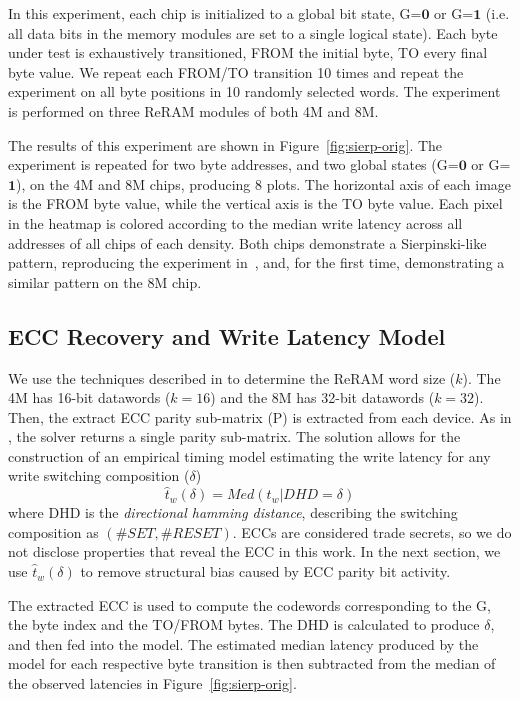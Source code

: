 In this experiment, each chip is initialized to a global bit state, G=$\mathbf{0}$ or G=$\mathbf{1}$ (i.e. all data bits in the memory modules are set to a single logical state). Each byte under test is exhaustively transitioned, FROM the initial byte, TO every final byte value. We repeat each FROM/TO transition 10 times and repeat the experiment on all byte positions in 10 randomly selected words. The experiment is performed on three ReRAM modules of both 4M and 8M.

The results of this experiment are shown in Figure~\ref{fig:sierp-orig}. The experiment is repeated for two byte addresses, and two global states (G=$\mathbf{0}$ or G=$\mathbf{1}$), on the 4M and 8M chips, producing 8 plots. The horizontal axis of each image is the FROM byte value, while the vertical axis is the TO byte value. Each pixel in the heatmap is colored according to the median write latency across all addresses of all chips of each density. Both chips demonstrate a Sierpinski-like pattern, reproducing the experiment in~\cite{tolga2024trng}, and, for the first time, demonstrating a similar pattern on the 8M chip.

\subsection{ECC Recovery and Write Latency Model}
We use the techniques described in \cite{sheaves2026brewrc} to determine the ReRAM word size ($k$). The 4M has 16-bit datawords ($k=16$) and the 8M has 32-bit datawords ($k=32$). Then, the extract ECC parity sub-matrix (P) is extracted from each device. As in \cite{sheaves2026brewrc}, the solver returns a single parity sub-matrix. The solution allows for the construction of an empirical timing model estimating the write latency for any write switching composition ($\delta$) \begin{equation}
    \hat{t}_w\left( \delta\right) = Med\left( t_w | DHD=\delta\right)
\end{equation}
where DHD is the \emph{directional hamming distance}, describing the switching composition as $(\#SET, \#RESET)$. ECCs are considered trade secrets, so we do not disclose properties that reveal the ECC in this work. In the next section, we use $\hat{t}_w\left( \delta\right)$ to remove structural bias caused by ECC parity bit activity.


The extracted ECC is used to compute the codewords corresponding to the G, the byte index and the TO/FROM bytes. The DHD is calculated to produce $\delta$, and then fed into the model. The estimated median latency produced by the model for each respective byte transition is then subtracted from the median of the observed latencies in Figure~\ref{fig:sierp-orig}.


